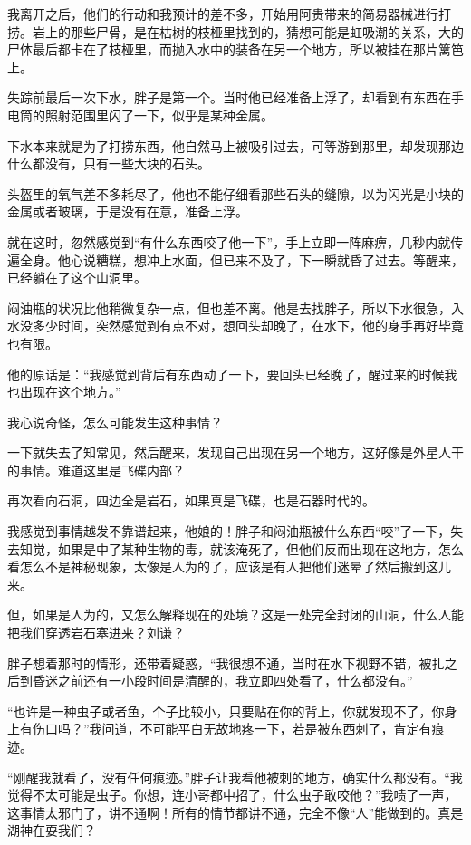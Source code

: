 我离开之后，他们的行动和我预计的差不多，开始用阿贵带来的简易器械进行打捞。岩上的那些尸骨，是在枯树的枝桠里找到的，猜想可能是虹吸潮的关系，大的尸体最后都卡在了枝桠里，而抛入水中的装备在另一个地方，所以被挂在那片篱笆上。

失踪前最后一次下水，胖子是第一个。当时他已经准备上浮了，却看到有东西在手电筒的照射范围里闪了一下，似乎是某种金属。

下水本来就是为了打捞东西，他自然马上被吸引过去，可等游到那里，却发现那边什么都没有，只有一些大块的石头。

头盔里的氧气差不多耗尽了，他也不能仔细看那些石头的缝隙，以为闪光是小块的金属或者玻璃，于是没有在意，准备上浮。

就在这时，忽然感觉到“有什么东西咬了他一下”，手上立即一阵麻痹，几秒内就传遍全身。他心说糟糕，想冲上水面，但已来不及了，下一瞬就昏了过去。等醒来，已经躺在了这个山洞里。

闷油瓶的状况比他稍微复杂一点，但也差不离。他是去找胖子，所以下水很急，入水没多少时间，突然感觉到有点不对，想回头却晚了，在水下，他的身手再好毕竟也有限。

他的原话是：“我感觉到背后有东西动了一下，要回头已经晚了，醒过来的时候我也出现在这个地方。”

我心说奇怪，怎么可能发生这种事情？

一下就失去了知常见，然后醒来，发现自己出现在另一个地方，这好像是外星人干的事情。难道这里是飞碟内部？

再次看向石洞，四边全是岩石，如果真是飞碟，也是石器时代的。

我感觉到事情越发不靠谱起来，他娘的！胖子和闷油瓶被什么东西“咬”了一下，失去知觉，如果是中了某种生物的毒，就该淹死了，但他们反而出现在这地方，怎么看怎么不是神秘现象，太像是人为的了，应该是有人把他们迷晕了然后搬到这儿来。

但，如果是人为的，又怎么解释现在的处境？这是一处完全封闭的山洞，什么人能把我们穿透岩石塞进来？刘谦？

胖子想着那时的情形，还带着疑惑，“我很想不通，当时在水下视野不错，被扎之后到昏迷之前还有一小段时间是清醒的，我立即四处看了，什么都没有。”

“也许是一种虫子或者鱼，个子比较小，只要贴在你的背上，你就发现不了，你身上有伤口吗？”我问道，不可能平白无故地疼一下，若是被东西刺了，肯定有痕迹。

“刚醒我就看了，没有任何痕迹。”胖子让我看他被刺的地方，确实什么都没有。“我觉得不太可能是虫子。你想，连小哥都中招了，什么虫子敢咬他？”我啧了一声，这事情太邪门了，讲不通啊！所有的情节都讲不通，完全不像“人”能做到的。真是湖神在耍我们？

